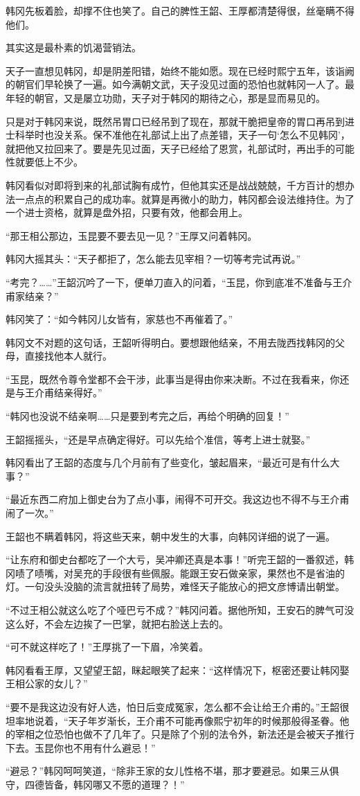 韩冈先板着脸，却撑不住也笑了。自己的脾性王韶、王厚都清楚得很，丝毫瞒不得他们。

其实这是最朴素的饥渴营销法。

天子一直想见韩冈，却是阴差阳错，始终不能如愿。现在已经时熙宁五年，该诣阙的朝官们早轮换了一遍。如今满朝文武，天子没见过面的恐怕也就韩冈一人了。最年轻的朝官，又是屡立功勋，天子对于韩冈的期待之心，那是显而易见的。

只是对于韩冈来说，既然吊胃口已经吊到了现在，那就干脆把皇帝的胃口再吊到进士科举时也没关系。保不准他在礼部试上出了点差错，天子一句‘怎么不见韩冈’，就把他又拉回来了。要是先见过面，天子已经给了恩赏，礼部试时，再出手的可能性就要低上不少。

韩冈看似对即将到来的礼部试胸有成竹，但他其实还是战战兢兢，千方百计的想办法一点点的积累自己的成功率。就算是再微小的助力，韩冈都会设法维持住。为了一个进士资格，就算是盘外招，只要有效，他都会用上。

“那王相公那边，玉昆要不要去见一见？”王厚又问着韩冈。

韩冈大摇其头：“天子都拒了，怎么能去见宰相？一切等考完试再说。”

“考完？……”王韶沉吟了一下，便单刀直入的问着，“玉昆，你到底准不准备与王介甫家结亲？”

韩冈笑了：“如今韩冈儿女皆有，家慈也不再催着了。”

韩冈文不对题的这句话，王韶听得明白。要想跟他结亲，不用去陇西找韩冈的父母，直接找他本人就行。

“玉昆，既然令尊令堂都不会干涉，此事当是得由你来决断。不过在我看来，你还是与王介甫结亲得好。”

“韩冈也没说不结亲啊……只是要到考完之后，再给个明确的回复！”

王韶摇摇头，“还是早点确定得好。可以先给个准信，等考上进士就娶。”

韩冈看出了王韶的态度与几个月前有了些变化，皱起眉来，“最近可是有什么大事？”

“最近东西二府加上御史台为了点小事，闹得不可开交。我这边也不得不与王介甫闹了一次。”

王韶也不瞒着韩冈，将这些天来，朝中发生的大事，向韩冈详细的说了一遍。

“让东府和御史台都吃了一个大亏，吴冲卿还真是本事！”听完王韶的一番叙述，韩冈啧了啧嘴，对吴充的手段很有些佩服。能跟王安石做亲家，果然也不是省油的灯。一句没头没脑的流言就扭转了局势，难怪天子能放心的把文彦博请出朝堂。

“不过王相公就这么吃了个哑巴亏不成？”韩冈问着。据他所知，王安石的脾气可没这么好，不会左边挨了一巴掌，就把右脸送上去的。

“可不就这样吃了！”王厚挑了一下眉，冷笑着。

韩冈看看王厚，又望望王韶，眯起眼笑了起来：“这样情况下，枢密还要让韩冈娶王相公家的女儿？”

“要不是我这边没有好人选，怕日后变成冤家，怎么都不会让给王介甫的。”王韶很坦率地说着，“天子年岁渐长，王介甫不可能再像熙宁初年的时候那般得圣眷。他的宰相之位恐怕也做不了几年了。只是除了个别的法令外，新法还是会被天子推行下去。玉昆你也不用有什么避忌！”

“避忌？”韩冈呵呵笑道，“除非王家的女儿性格不堪，那才要避忌。如果三从俱守，四德皆备，韩冈哪又不愿的道理？！”

